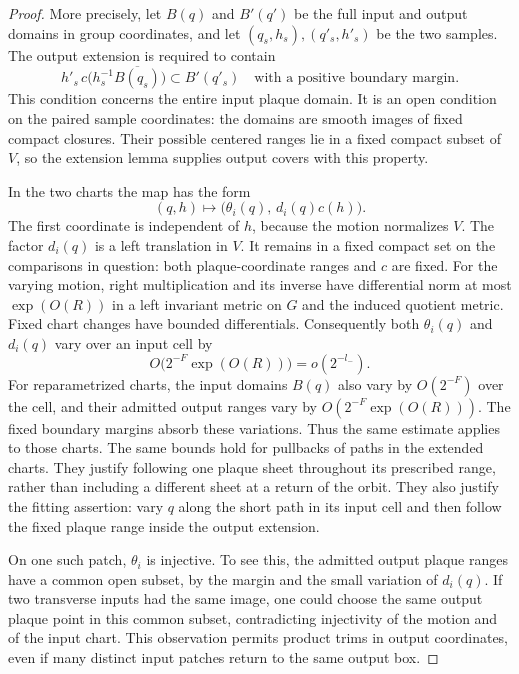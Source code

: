 \begin{proof}
More precisely, let $B(q)$ and $B'(q')$ be the full input and output
domains in group coordinates, and let $(q_s,h_s),(q'_s,h'_s)$ be the
two samples. The output extension is required to contain
\begin{equation}\label{eq:full-plaque-margin}
 h'_s\,c\bigl(h_s^{-1}\overline{B(q_s)}\bigr)\subset B'(q'_s)
 \quad\text{with a positive boundary margin}.
\end{equation}
This condition concerns the entire input plaque domain. It is an
open condition on the paired sample coordinates: the domains are
smooth images of fixed compact closures. Their possible centered
ranges lie in a fixed compact subset of $V$, so the extension lemma
supplies output covers with this property.

In the two charts the map has the form
\begin{equation}\label{eq:plaque-transition}
 (q,h)\longmapsto\bigl(\theta_i(q),\,d_i(q)c(h)\bigr).
\end{equation}
The first coordinate is independent of $h$, because the motion
normalizes $V$. The factor $d_i(q)$ is a left translation in $V$.
It remains in a fixed compact set on the comparisons in question:
both plaque-coordinate ranges and $c$ are fixed. For the varying
motion, right multiplication and its inverse have differential norm
at most $\exp(O(R))$ in a left invariant metric on $G$ and the
induced quotient metric. Fixed chart changes have bounded
differentials. Consequently both $\theta_i(q)$ and $d_i(q)$ vary over an
input cell by
\begin{equation}\label{eq:transverse-image-width}
O\bigl(2^{-F}\exp(O(R))\bigr)=o(2^{-l_-}).
\end{equation}
For reparametrized charts, the input domains $B(q)$ also vary by
$O(2^{-F})$ over the cell, and their admitted output ranges vary by
$O(2^{-F}\exp(O(R)))$. The fixed boundary margins absorb these
variations. Thus the same estimate applies to those charts.
The same bounds hold for pullbacks of paths in the extended charts.
They justify following one plaque sheet throughout its prescribed
range, rather than including a different sheet at a return of the
orbit. They also justify the fitting assertion: vary $q$ along the
short path in its input cell and then follow the fixed plaque range
inside the output extension.

On one such patch, $\theta_i$ is injective. To see this, the admitted
output plaque ranges have a common open subset, by the margin and
the small variation of $d_i(q)$. If two transverse inputs had the
same image, one could choose the same output plaque point in this
common subset, contradicting injectivity of the motion and of the
input chart. This observation permits product trims in output
coordinates, even if many distinct input patches return to the
same output box.


\end{proof}
